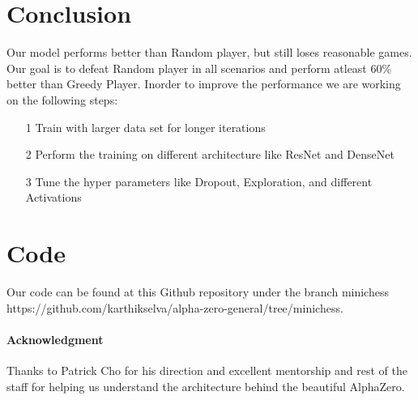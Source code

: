 \documentclass[11pt]{article}
\begin{document}
\section{Conclusion}
\label{sec:conclusion}

Our model performs better than Random player, but still loses reasonable games. Our goal is to defeat Random player in all scenarios and perform atleast 60\% better than Greedy Player. Inorder to improve the performance we are working on the following steps:

\begin{itemize}
	\item[1] Train with larger data set for longer iterations 
	\item[2] Perform the training on different architecture like ResNet and DenseNet 
	\item[3] Tune the hyper parameters like Dropout, Exploration, and different Activations
\end{itemize}

%
%

\section{Code}
Our code can be found at this Github repository under the branch minichess https://github.com/karthikselva/alpha-zero-general/tree/minichess.

\paragraph{Acknowledgment}

Thanks to Patrick Cho for his direction and excellent mentorship and rest of the staff for helping us understand the architecture behind the beautiful AlphaZero.
\end{document}
